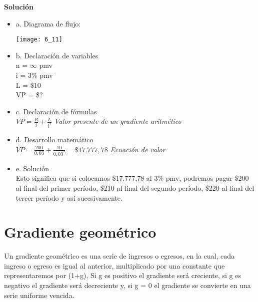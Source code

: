 	\textbf{Solución}\\
	\begin{itemize}
		\item a. Diagrama de flujo:\\
		\begin{center}
			\texttt{[image: 6\_11]}
		\end{center}
		
		\clearpage
		
		\item b. Declaración de variables\\
		n = $\infty$ \hspace{3 pt} pmv\\ 
		i = 3\% pmv\\ 
		L = \$10\\
		VP = \$?\\
        \item c. Declaración de fórmulas\\
        $VP = \frac{R}{i} + \frac{L}{i^2}$ \hspace{35 pt} \textit{Valor presente de un gradiente aritmético}\\
        \item d. Desarrollo matemático\\
		$VP = \frac{200}{0,03} + \frac{10}{0,03^{2}} = \$17.777,78$ \hspace{35 pt} \textit{Ecuación de valor }\\
		\item e. Solución\\
		Esto significa que si colocamos \$17.777,78 al 3\% pmv, podremos pagar \$200 al final del primer período, \$210 al final del segundo período, \$220 al final del tercer período y así sucesivamente.
	\end{itemize}
	
	\section{Gradiente geométrico}
	Un gradiente geométrico es una serie de ingresos o egresos, en la cual, cada ingreso o egreso es igual al anterior, multiplicado por una constante que representaremos por (1+g), Si g es positivo el gradiente será creciente, si g es negativo el gradiente será decreciente y, si g = 0 el gradiente se convierte en una serie uniforme vencida.\\
	
